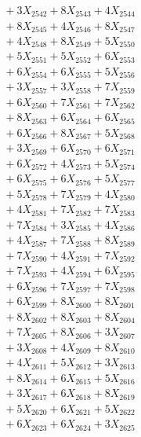 \documentclass[a4paper,10pt]{article}
\begin{document}
{\begin{align}
&\;  + 3 X_{2542} + 8 X_{2543} + 4 X_{2544} \\[0.3ex]
&\;  + 8 X_{2545} + 4 X_{2546} + 8 X_{2547} \\[0.3ex]
&\;  + 4 X_{2548} + 8 X_{2549} + 5 X_{2550} \\[0.3ex]
&\;  + 5 X_{2551} + 5 X_{2552} + 6 X_{2553} \\[0.3ex]
&\;  + 6 X_{2554} + 6 X_{2555} + 5 X_{2556} \\[0.3ex]
&\;  + 3 X_{2557} + 3 X_{2558} + 7 X_{2559} \\[0.5ex]\allowbreak
&\;  + 6 X_{2560} + 7 X_{2561} + 7 X_{2562} \\[0.3ex]
&\;  + 8 X_{2563} + 6 X_{2564} + 6 X_{2565} \\[0.3ex]
&\;  + 6 X_{2566} + 8 X_{2567} + 5 X_{2568} \\[0.3ex]
&\;  + 3 X_{2569} + 6 X_{2570} + 6 X_{2571} \\[0.3ex]
&\;  + 6 X_{2572} + 4 X_{2573} + 5 X_{2574} \\[0.3ex]
&\;  + 6 X_{2575} + 6 X_{2576} + 5 X_{2577} \\[0.3ex]
&\;  + 5 X_{2578} + 7 X_{2579} + 4 X_{2580} \\[0.3ex]
&\;  + 4 X_{2581} + 7 X_{2582} + 7 X_{2583} \\[0.3ex]
&\;  + 7 X_{2584} + 3 X_{2585} + 4 X_{2586} \\[0.3ex]
&\;  + 4 X_{2587} + 7 X_{2588} + 8 X_{2589} \\[0.5ex]\allowbreak
&\;  + 7 X_{2590} + 4 X_{2591} + 7 X_{2592} \\[0.3ex]
&\;  + 7 X_{2593} + 4 X_{2594} + 6 X_{2595} \\[0.3ex]
&\;  + 6 X_{2596} + 7 X_{2597} + 7 X_{2598} \\[0.3ex]
&\;  + 6 X_{2599} + 8 X_{2600} + 8 X_{2601} \\[0.3ex]
&\;  + 8 X_{2602} + 8 X_{2603} + 8 X_{2604} \\[0.3ex]
&\;  + 7 X_{2605} + 8 X_{2606} + 3 X_{2607} \\[0.3ex]
&\;  + 3 X_{2608} + 4 X_{2609} + 8 X_{2610} \\[0.3ex]
&\;  + 4 X_{2611} + 5 X_{2612} + 3 X_{2613} \\[0.3ex]
&\;  + 8 X_{2614} + 6 X_{2615} + 5 X_{2616} \\[0.3ex]
&\;  + 3 X_{2617} + 6 X_{2618} + 8 X_{2619} \\[0.5ex]\allowbreak
&\;  + 5 X_{2620} + 6 X_{2621} + 5 X_{2622} \\[0.3ex]
&\;  + 6 X_{2623} + 6 X_{2624} + 3 X_{2625} \\[0.3ex]

\end{align}}
\end{document}
